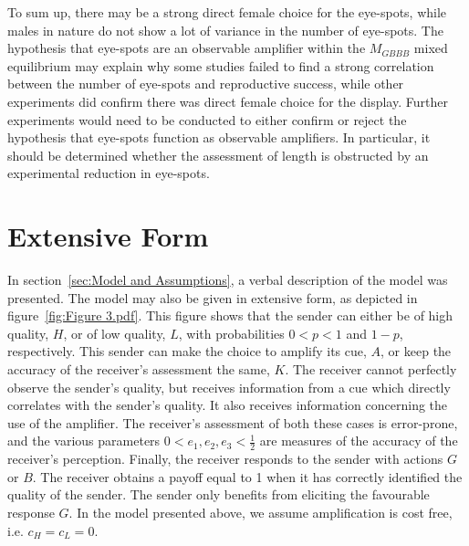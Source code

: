 \documentclass[a4paper,12pt]{article}
\numberwithin{equation}{section}
\begin{document}
To sum up, there may be a strong direct female choice for the eye-spots, while males in nature do not show a lot of variance in the number of eye-spots. The hypothesis that eye-spots are an observable amplifier within the $M_{GBBB}$ mixed equilibrium may explain why some studies failed to find a strong correlation between the number of eye-spots and reproductive success, while other experiments did confirm there was direct female choice for the display. Further experiments would need to be conducted to either confirm or reject the hypothesis that eye-spots function as observable amplifiers. In particular, it should be determined whether the assessment of length is obstructed by an experimental reduction in eye-spots.

\newpage


\label{sec:Bibliography}
\renewcommand{\refname}{Bibliography}



\newpage


\appendix

\section{Extensive Form}
\label{sec:Extensive Form}

In section~\ref{sec:Model and Assumptions}, a verbal description of the model was presented. The model may also be given in extensive form, as depicted in figure~\ref{fig:Figure 3.pdf}. This figure shows that the sender can either be of high quality, $H$, or of low quality, $L$, with probabilities $0<p<1$ and $1-p$, respectively. This sender can make the choice to amplify its cue, $A$, or keep the accuracy of the receiver's assessment the same, $K$. The receiver cannot perfectly observe the sender's quality, but receives information from a cue which directly correlates with the sender's quality. It also receives information concerning the use of the amplifier. The receiver's assessment of both these cases is error-prone, and the various parameters $0<e_{1},e_{2},e_{3}<\frac{1}{2}$ are measures of the accuracy of the receiver's perception. Finally, the receiver responds to the sender with actions $G$ or $B$. The receiver obtains a payoff equal to 1 when it has correctly identified the quality of the sender. The sender only benefits from eliciting the favourable response $G$. In the model presented above, we assume amplification is cost free, i.e. $c_{H} = c_{L} = 0$.
\end{document}
